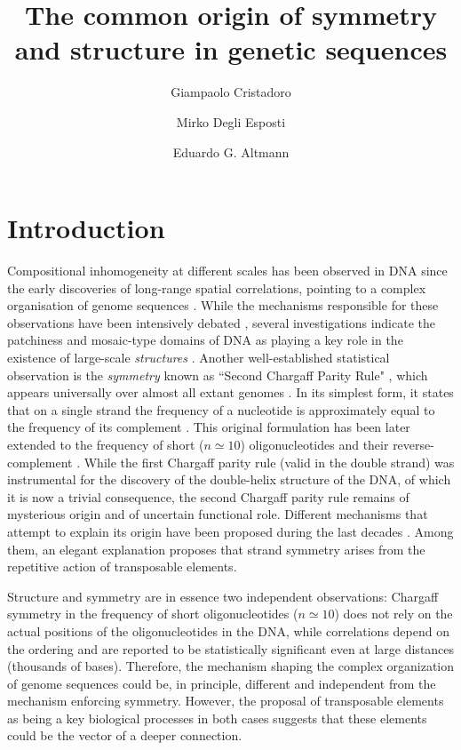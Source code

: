 \documentclass[fleqn,10pt]{wlscirep}
\title{The common origin of symmetry and structure in genetic sequences}
\author[1,*]{Giampaolo Cristadoro}
\author[2]{Mirko Degli Esposti}
\author[3]{Eduardo G. Altmann}
\affil[1]{Dipartimento di Matematica e Applicazioni, Universit\`a di Milano-Bicocca, 20125 Milano, Italy}
\affil[2]{Dipartimento di Informatica, Universit\`a di Bologna, 40126 Bologna, Italy}
\affil[3]{School of Mathematics and Statistics, University of Sydney, 2006 NSW, Australia}
\affil[*]{giampaolo.cristadoro@unimib.it}
\begin{document}
\flushbottom
\maketitle
%
\thispagestyle{empty}

\section*{Introduction}

Compositional  inhomogeneity at different scales has been  observed in DNA since the early discoveries of 
long-range spatial correlations,  pointing to a complex organisation of genome sequences  \cite{PBGHSSS92,LK92,V92}. 
While the mechanisms responsible for these observations have been intensively debated \cite{A92,N92, P92, KB93, LMK94, BS12}, several investigations indicate the patchiness and mosaic-type domains of DNA as playing a key role in the existence of large-scale {\it structures} \cite{ KB93, PBHSSG93, BGRO96}.
Another well-established statistical observation is the {\it symmetry} known as ``Second Chargaff Parity Rule" \cite{RKC68}, which appears universally over almost all extant genomes  \cite{R91,MB06,NA06}. In its simplest form, it states that on a single strand the frequency  of a nucleotide is approximately equal to the frequency of its complement \cite{FTW92,P93, BF99, QC01, PHB02}. This original formulation has been later extended  to the frequency of  short ($n \simeq 10$)  oligonucleotides and their reverse-complement  \cite{PHB02, KFCHZZL09, ABGRPF13}. While the first Chargaff parity rule \cite{C51} (valid in the double strand) was instrumental for the discovery of the double-helix structure of the DNA, of which it is now a trivial consequence, the second Chargaff parity rule remains of mysterious origin and of uncertain functional role.  Different mechanisms that attempt to explain its origin have been proposed during the last decades \cite{BF99,BF99b,LL99,B06,ZH10}.  Among them, an elegant  explanation \cite{B06,SCRH16} proposes that strand symmetry arises from the repetitive action of transposable elements.

Structure and symmetry are in essence two  independent observations:  Chargaff symmetry in the frequency of short oligonucleotides ($n \simeq 10$) does not rely on the actual positions of the oligonucleotides in the DNA, while correlations depend on the ordering and are reported to be statistically significant even at large distances (thousands of bases). Therefore, the mechanism shaping the complex organization of genome sequences could be, in principle, different and independent from the mechanism enforcing symmetry. 
However, the proposal of transposable elements \cite{M84, F12} as being a key biological processes in both cases suggests that these elements could be the vector of a deeper connection.
\end{document}

